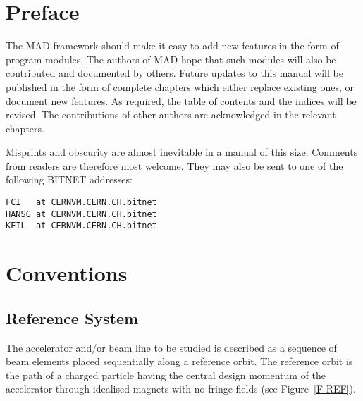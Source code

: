 \chapter*{Preface}
\par The MAD framework should make it easy to add new features
in the form of program modules.
The authors of MAD hope that such modules will also be contributed
and documented by others.
Future updates to this manual will be published in the form of
complete chapters which either replace existing ones,
or document new features.
As required, the table of contents and the indices will be revised.
The contributions of other authors are acknowledged in the relevant
chapters.
\par Misprints and obscurity are almost inevitable in a manual
of this size.
Comments from readers are therefore most welcome.
They may also be sent to one of the following BITNET addresses:
\begin{verbatim}
FCI   at CERNVM.CERN.CH.bitnet
HANSG at CERNVM.CERN.CH.bitnet
KEIL  at CERNVM.CERN.CH.bitnet
\end{verbatim}
\cleardoublepage
 
\tableofcontents
\listoffigures
\listoftables
 
\cleardoublepage
 
\chapter{Conventions}
\label{S-CONVENT}
 
\section{Reference System}
\label{S-REFER}
The accelerator and/or beam line to be studied is described as
a sequence of beam elements placed sequentially along a reference
orbit.
The reference orbit is the path of a charged particle having the
central design momentum of the accelerator through idealised magnets
with no fringe fields (see Figure~\ref{F-REF}).
 
